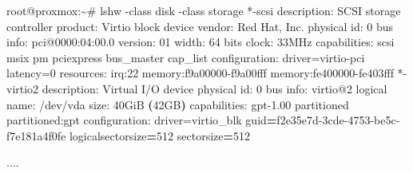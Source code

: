 \documentclass[
  10pt,
]{krantz}
\newenvironment{Shaded}{\begin{snugshade}}{\end{snugshade}}
\newcommand{\AttributeTok}[1]{\textcolor[rgb]{0.77,0.63,0.00}{#1}}
\newcommand{\ErrorTok}[1]{\textcolor[rgb]{0.64,0.00,0.00}{\textbf{#1}}}
\newcommand{\ExtensionTok}[1]{#1}
\newcommand{\KeywordTok}[1]{\textcolor[rgb]{0.13,0.29,0.53}{\textbf{#1}}}
\newcommand{\NormalTok}[1]{#1}
\newcommand{\OperatorTok}[1]{\textcolor[rgb]{0.81,0.36,0.00}{\textbf{#1}}}
\newcommand{\VariableTok}[1]{\textcolor[rgb]{0.00,0.00,0.00}{#1}}
\begin{document}
\begin{Shaded}
\begin{Highlighting}[]
\ExtensionTok{root@proxmox:\textasciitilde{}\#}\NormalTok{ lshw }\AttributeTok{{-}class}\NormalTok{ disk }\AttributeTok{{-}class}\NormalTok{ storage }
 \ExtensionTok{*{-}scsi}                    
       \ExtensionTok{description:}\NormalTok{ SCSI storage controller}
       \ExtensionTok{product:}\NormalTok{ Virtio block device}
       \ExtensionTok{vendor:}\NormalTok{ Red Hat, Inc.}
       \ExtensionTok{physical}\NormalTok{ id: 0}
       \ExtensionTok{bus}\NormalTok{ info: pci@0000:04:00.0}
       \ExtensionTok{version:}\NormalTok{ 01}
       \ExtensionTok{width:}\NormalTok{ 64 bits}
       \ExtensionTok{clock:}\NormalTok{ 33MHz}
       \ExtensionTok{capabilities:}\NormalTok{ scsi msix pm pciexpress bus\_master cap\_list}
       \ExtensionTok{configuration:}\NormalTok{ driver=virtio{-}pci latency=0}
       \ExtensionTok{resources:}\NormalTok{ irq:22 memory:f9a00000{-}f9a00fff memory:fe400000{-}fe403fff}
     \ExtensionTok{*{-}virtio2}
          \ExtensionTok{description:}\NormalTok{ Virtual I/O device}
          \ExtensionTok{physical}\NormalTok{ id: 0}
          \ExtensionTok{bus}\NormalTok{ info: virtio@2}
          \ExtensionTok{logical}\NormalTok{ name: /dev/vda}
          \ExtensionTok{size:}\NormalTok{ 40GiB }\ErrorTok{(}\ExtensionTok{42GB}\KeywordTok{)}
          \ExtensionTok{capabilities:}\NormalTok{ gpt{-}1.00 partitioned partitioned:gpt}
          \ExtensionTok{configuration:}\NormalTok{ driver=virtio\_blk}
          \VariableTok{guid}\OperatorTok{=}\NormalTok{f2e35e7d{-}3cde{-}4753{-}be5c{-}f7e181a4f0fe }\VariableTok{logicalsectorsize}\OperatorTok{=}\NormalTok{512}
          \VariableTok{sectorsize}\OperatorTok{=}\NormalTok{512}

\ExtensionTok{....}


\end{Highlighting}
\end{Shaded}
\end{document}
